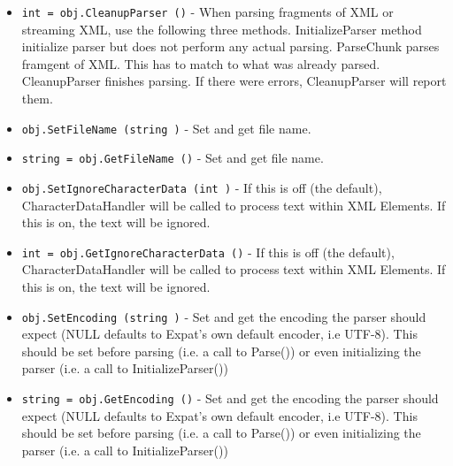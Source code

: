 \begin{itemize}
\item  \verb|int = obj.CleanupParser ()| -  When parsing fragments of XML or streaming XML, use the following
 three methods.  InitializeParser method initialize parser but
 does not perform any actual parsing.  ParseChunk parses framgent
 of XML. This has to match to what was already
 parsed. CleanupParser finishes parsing. If there were errors,
 CleanupParser will report them.

\item  \verb|obj.SetFileName (string )| -  Set and get file name.

\item  \verb|string = obj.GetFileName ()| -  Set and get file name.

\item  \verb|obj.SetIgnoreCharacterData (int )| -  If this is off (the default), CharacterDataHandler will be called to 
 process text within XML Elements. If this is on, the text will be 
 ignored.

\item  \verb|int = obj.GetIgnoreCharacterData ()| -  If this is off (the default), CharacterDataHandler will be called to 
 process text within XML Elements. If this is on, the text will be 
 ignored.

\item  \verb|obj.SetEncoding (string )| -  Set and get the encoding the parser should expect (NULL defaults to
 Expat's own default encoder, i.e UTF-8).
 This should be set before parsing (i.e. a call to Parse()) or
 even initializing the parser (i.e. a call to InitializeParser())

\item  \verb|string = obj.GetEncoding ()| -  Set and get the encoding the parser should expect (NULL defaults to
 Expat's own default encoder, i.e UTF-8).
 This should be set before parsing (i.e. a call to Parse()) or
 even initializing the parser (i.e. a call to InitializeParser())

\end{itemize}
